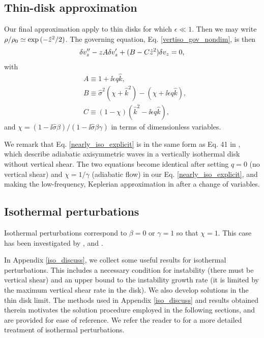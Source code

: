 \subsection{Thin-disk approximation}\label{analytic_relax}
Our final approximation apply to thin disks for 
which $\epsilon\ll 1$. Then we may write $\rho/\rho_0\simeq
\exp{(-\hat{z}^2/2)}$. The governing equation,
Eq. \ref{vertiso_gov_nondim}, is then   
\begin{align}
  \delta v_z^{\prime\prime} - z A\delta v_z^\prime +
  (B - C\hat{z}^2)\delta v_z = 0,\label{nearly_iso_explicit}
\end{align}
with
\begin{align}
  &A \equiv 1 + \ii \epsilon q \hat{k},\\
  &B \equiv \hat{\sigma}^2\left(\chi + \hat{k}^2\right) -
  \left(\chi + \ii \epsilon q \hat{k}\right),\\
  &C \equiv \left(1-\chi\right)\left(\hat{k}^2 - \ii
    \epsilon q\hat{k}\right), 
\end{align}
and $\chi =
\left(1-\ii\hat{\sigma}\beta\right)/\left(1-\ii\hat{\sigma}\beta\gamma\right)
$ in terms of dimensionless variables. 

We remark that Eq. \ref{nearly_iso_explicit} is in the same 
form as Eq. 41 in \cite{lubow93}, which describe adiabatic axisymmetric waves in
a vertically isothermal disk without vertical shear. The two equations
become identical after  setting $q=0$ (no vertical shear) and
$\chi=1/\gamma$ (adiabatic flow) in our Eq. \ref{nearly_iso_explicit},
and making the low-frequency, Keplerian approximation in
\citeauthor{lubow93} after a change of variables.    


\subsection{Isothermal perturbations}\label{iso_pert}
Isothermal perturbations correspond to $\beta = 0$ or $\gamma=1$ so 
that $\chi = 1$. This case has been investigated by ,
 and .  

In Appendix \ref{iso_discuss}, we collect some useful results for
isothermal  perturbations. This includes a necessary condition for
instability (there must be vertical shear) and an upper bound to the
instability growth rate (it is limited by the maximum vertical shear
rate in the disk). We also develop solutions in the thin disk
limit. The methods used in Appendix \ref{iso_discuss} and results obtained
therein motivates the solution procedure employed in the following
sections, and are provided for ease of reference. We refer the reader
to  for a more detailed treatment of isothermal 
perturbations. %

